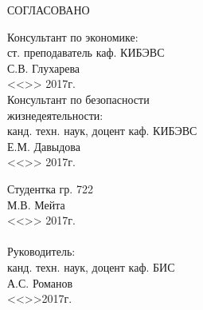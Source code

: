 СОГЛАСОВАНО
\vspace{0.01cm}
\begin{singlespace}
 \begin{minipage}[left]{0.40\linewidth}
 Консультант по экономике:\\
 ст. преподаватель каф. КИБЭВС \\
 \underline{\hspace{2.5cm}}С.В. Глухарева \\
 <<\underline{\hspace{1cm}}>>\underline{\hspace{3cm}} 2017г.\\

 Консультант по безопасности\\ жизнедеятельности:\\
 канд. техн. наук, доцент каф. КИБЭВС\\
 \underline{\hspace{2.5cm}}Е.М. Давыдова\\
 <<\underline{\hspace{1cm}}>>\underline{\hspace{3cm}} 2017г.\\
 \end{minipage}
 \hfill
 \begin{minipage}[left]{0.5\linewidth}
  \vspace{0.7cm}
  Студентка гр. 722 \\
  \underline{\hspace{3cm}}М.В. Мейта  \\
 <<\underline{\hspace{1cm}}>>\underline{\hspace{3cm}} 2017г.\\
 \vspace{0.3cm}\\ 
  Руководитель: \\
  канд. техн. наук, доцент каф. БИС \\
  \underline{\hspace{3cm}} А.С. Романов \\
  <<\underline{\hspace{1cm}}>>\underline{\hspace{3cm}}2017г.\\
 \end{minipage}
\end{singlespace}



